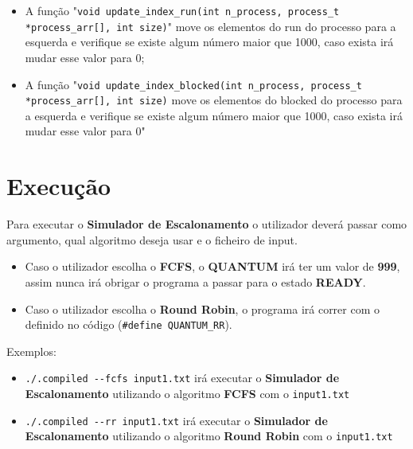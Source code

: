 \documentclass[11pt]{article}   %
\begin{document}
\begin{itemize}
\begin{itemize}
            \item A função "\verb|void update_index_run(int n_process, process_t *process_arr[], int size)|" \newline move os elementos do run do processo para a esquerda e verifique se existe algum número maior que 1000, caso exista irá mudar esse valor para 0;
            \item A função "\verb|void update_index_blocked(int n_process, process_t *process_arr[], int size)| \newline move os elementos do blocked do processo para a esquerda e verifique se existe algum número maior que 1000, caso exista irá mudar esse valor para 0"
        \end{itemize}
\end{itemize}

\section{Execução}

\hspace{0,5cm}Para executar o \textbf{Simulador de Escalonamento} o utilizador deverá passar como argumento, qual algoritmo deseja usar e o ficheiro de input.
\begin{itemize}
    \item Caso o utilizador escolha o \textbf{FCFS}, o \textbf{QUANTUM} irá ter um valor de \textbf{999}, assim nunca irá obrigar o programa a passar para o estado \textbf{READY}.
    \item Caso o utilizador escolha o \textbf{Round Robin}, o programa irá correr com o  definido no código (\verb|#define QUANTUM_RR|).
\end{itemize}
\par Exemplos:
\begin{itemize}
    \item \verb|./.compiled --fcfs input1.txt| irá executar o \textbf{Simulador de Escalonamento} utilizando o algoritmo \textbf{FCFS} com o \verb|input1.txt|
    \item \verb|./.compiled --rr input1.txt| irá executar o \textbf{Simulador de Escalonamento} utilizando o algoritmo \textbf{Round Robin} com o \verb|input1.txt|
\end{itemize}
\end{document}
